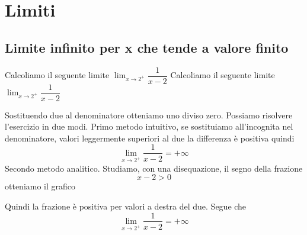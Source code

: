 \chapter{Limiti}
\section{Limite infinito per x che tende a valore finito}
\tcbstartrecording
\begin{exercise}
Calcoliamo il seguente limite
$\lim_{x\to 2^+}\dfrac{1}{x-2}$
	\tcblower
Calcoliamo il seguente limite
$\lim_{x\to 2^+}\dfrac{1}{x-2}$
	
Sostituendo due al denominatore otteniamo uno diviso zero. Possiamo risolvere l'esercizio in due modi. Primo metodo intuitivo, se sostituiamo all'incognita nel denominatore, valori leggermente superiori al due la differenza è positiva quindi \begin{equation*}
\lim_{x\to 2^+}\dfrac{1}{x-2}=+\infty
\end{equation*} Secondo metodo analitico. Studiamo, con una disequazione, il segno della frazione
\[x-2>0 \] 
otteniamo il grafico
\begin{center}
	
\end{center}
Quindi la frazione è positiva per valori a destra del due. Segue che 
\begin{equation*}
\lim_{x\to 2^+}\dfrac{1}{x-2}=+\infty
\end{equation*}
\end{exercise}
